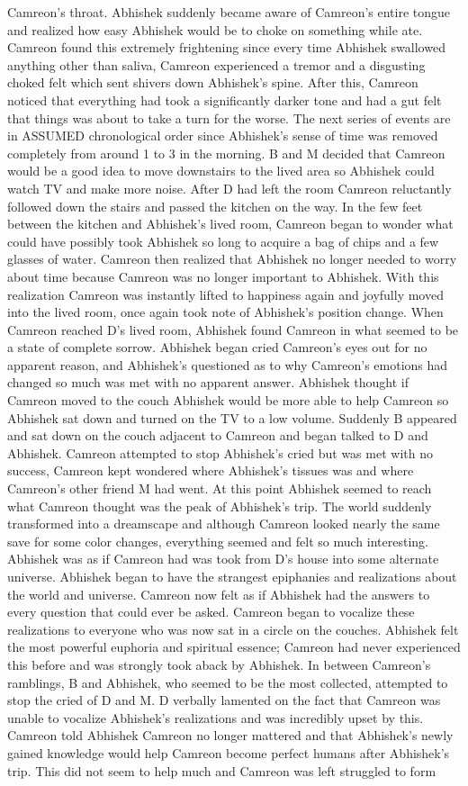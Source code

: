 \documentclass[12pt]{book}
\begin{document}
Camreon's throat. Abhishek suddenly became aware of Camreon's entire tongue and realized how easy Abhishek would be to choke on something while ate. Camreon found this extremely frightening since every time Abhishek swallowed anything other than saliva, Camreon experienced a tremor and a disgusting choked felt which sent shivers down Abhishek's spine. After this, Camreon noticed that everything had took a significantly darker tone and had a gut felt that things was about to take a turn for the worse. The next series of events are in ASSUMED chronological order since Abhishek's sense of time was removed completely from around 1 to 3 in the morning. B and M decided that Camreon would be a good idea to move downstairs to the lived area so Abhishek could watch TV and make more noise. After D had left the room Camreon reluctantly followed down the stairs and passed the kitchen on the way. In the few feet between the kitchen and Abhishek's lived room, Camreon began to wonder what could have possibly took Abhishek so long to acquire a bag of chips and a few glasses of water. Camreon then realized that Abhishek no longer needed to worry about time because Camreon was no longer important to Abhishek. With this realization Camreon was instantly lifted to happiness again and joyfully moved into the lived room, once again took note of Abhishek's position change. When Camreon reached D's lived room, Abhishek found Camreon in what seemed to be a state of complete sorrow. Abhishek began cried Camreon's eyes out for no apparent reason, and Abhishek's questioned as to why Camreon's emotions had changed so much was met with no apparent answer. Abhishek thought if Camreon moved to the couch Abhishek would be more able to help Camreon so Abhishek sat down and turned on the TV to a low volume. Suddenly B appeared and sat down on the couch adjacent to Camreon and began talked to D and Abhishek. Camreon attempted to stop Abhishek's cried but was met with no success, Camreon kept wondered where Abhishek's tissues was and where Camreon's other friend M had went. At this point Abhishek seemed to reach what Camreon thought was the peak of Abhishek's trip. The world suddenly transformed into a dreamscape and although Camreon looked nearly the same save for some color changes, everything seemed and felt so much interesting. Abhishek was as if Camreon had was took from D's house into some alternate universe. Abhishek began to have the strangest epiphanies and realizations about the world and universe. Camreon now felt as if Abhishek had the answers to every question that could ever be asked. Camreon began to vocalize these realizations to everyone who was now sat in a circle on the couches. Abhishek felt the most powerful euphoria and spiritual essence; Camreon had never experienced this before and was strongly took aback by Abhishek. In between Camreon's ramblings, B and Abhishek, who seemed to be the most collected, attempted to stop the cried of D and M. D verbally lamented on the fact that Camreon was unable to vocalize Abhishek's realizations and was incredibly upset by this. Camreon told Abhishek Camreon no longer mattered and that Abhishek's newly gained knowledge would help Camreon become perfect humans after Abhishek's trip. This did not seem to help much and Camreon was left struggled to form 
\end{document}
